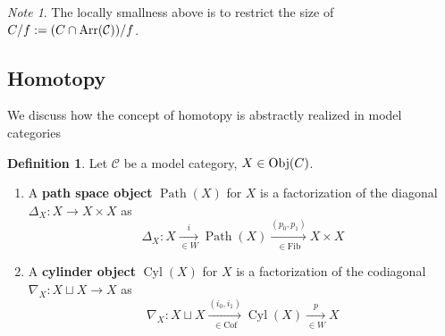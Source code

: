 \documentclass[a4paper]{article}
\theoremstyle{plain}
\theoremstyle{definition}
\newtheorem{defn}{Definition}[section]
\theoremstyle{remark}
\newtheorem*{note}{Note}
\newcommand{\mc}[1]{\mathcal{#1}}
\newcommand{\mcC}{\mc C}
\DeclareMathOperator{\Obj}{\rm{Obj}}
\DeclareMathOperator{\Arr}{\rm{Arr}}
\DeclareMathOperator{\Path}{Path}
\DeclareMathOperator{\Cyl}{Cyl}
\newcommand{\Cof}{\mathrm{Cof}}
\newcommand{\Fib}{\mathrm{Fib}}
\begin{document}
        \begin{note}
            The locally smallness above is to restrict the size of $C/f := (C \cap \Arr(\mcC))/f$.
        \end{note}


    \subsection{Homotopy}

        We discuss how the concept of homotopy is abstractly realized in model categories

        \begin{defn}
            Let $\mcC$ be a model category, $X \in \Obj(C)$.\\
            \begin{enumerate}
                \item A \textbf{path space object} $\Path(X)$ for $X$ is a factorization of the diagonal $\Delta_X : X \to X \times X$ as
                    $$ \Delta_X : X \xrightarrow[\in W]{i} \Path(X) \xrightarrow[\in \Fib]{(p_0,p_1)} X \times X $$
                \item A \textbf{cylinder object} $\Cyl(X)$ for $X$ is a factorization of the codiagonal $\nabla_X : X \sqcup X \to X$ as
                    $$ \nabla_X : X \sqcup  X \xrightarrow[\in \Cof]{(i_0, i_1)} \Cyl(X) \xrightarrow[\in W]{p} X $$
            \end{enumerate}
        \end{defn}



    
    
\end{document}
